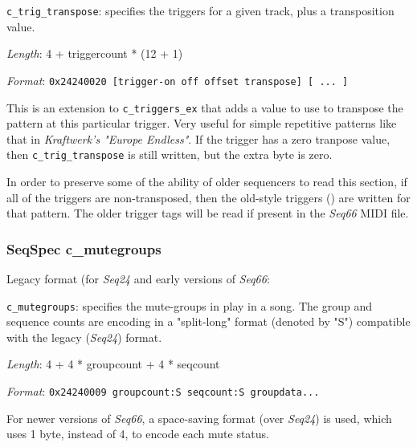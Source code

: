 
   \begin{description}
      \item \texttt{c\_trig\_transpose}: specifies the triggers for a given
         track, plus a transposition value.
      \item \textsl{Length}: 4 + triggercount * (12 + 1)
      \item \textsl{Format}: \texttt{0x24240020 [trigger-on off offset transpose]
         [ ... ]}
   \end{description}

   This is an extension to \texttt{c\_triggers\_ex} that adds a value to use to
   transpose the pattern at this particular trigger.
   Very useful for simple repetitive patterns like that in
   \textsl{Kraftwerk's "Europe Endless"}.
   If the trigger has a zero tranpose value, then 
   \texttt{c\_trig\_transpose} is still written, but the extra byte is zero.

   In order to preserve some of the ability of older sequencers to read this
   section, if all of the triggers are non-transposed, then the old-style
   triggers () are written for that pattern.
   The older trigger tags will be read if
   present in the \textsl{Seq66} MIDI file.

\subsubsection{SeqSpec c\_mutegroups}
\label{subsubsec:midi_format_track_seqspec_mutegroups}

   Legacy format (for \textsl{Seq24} and early versions of \textsl{Seq66}:

   \begin{description}
      \item \texttt{c\_mutegroups}: specifies the mute-groups in play in a song.
         The group and sequence counts are encoding in
         a "split-long" format (denoted by "S") compatible with the legacy
         (\textsl{Seq24}) format.
      \item \textsl{Length}: 4 + 4 * groupcount + 4 * seqcount
      \item \textsl{Format}: \texttt{0x24240009 groupcount:S seqcount:S groupdata...}
   \end{description}

   For newer versions of \textsl{Seq66},
   a space-saving format (over \textsl{Seq24}) is used, which uses 1 byte,
   instead of 4, to encode each mute status.

